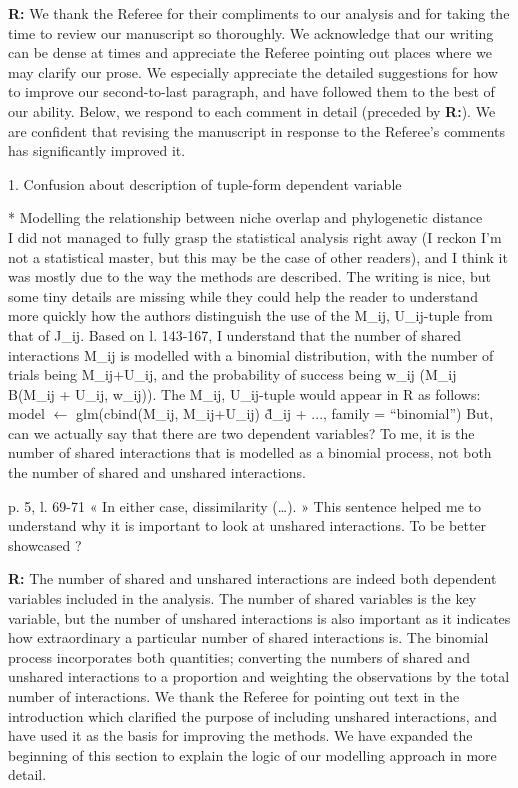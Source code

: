 \documentclass[12pt]{letter}
\newenvironment{refquote}{\bigskip \begin{it}}{\end{it}\smallskip}
\begin{document}
	\textbf{R:} We thank the Referee for their compliments to our analysis and for taking the time to review our manuscript so thoroughly. We acknowledge that our writing can be dense at times and appreciate the Referee pointing out places where we may clarify our prose. We especially appreciate the detailed suggestions for how to improve our second-to-last paragraph, and have followed them to the best of our ability. Below, we respond to each comment in detail (preceded by \textbf{R:}). We are confident that revising the manuscript in response to the Referee's comments has significantly improved it.


	1. Confusion about description of tuple-form dependent variable

		\begin{refquote}
			* Modelling the relationship between niche overlap and phylogenetic distance\\
			I did not managed to fully grasp the statistical analysis right away (I reckon I'm not a statistical master, but this may be the case of other readers), and I think it was mostly due to the way the methods are described. The writing is nice, but some tiny details are missing while they could help the reader to understand more quickly how the authors distinguish the use of the {M\_ij, U\_ij}-tuple from that of J\_ij.
			Based on l. 143-167, I understand that the number of shared interactions M\_ij is modelled with a binomial distribution, with the number of trials being M\_ij+U\_ij, and the probability of success being w\_ij (M\_ij ~ B(M\_ij + U\_ij, w\_ij)). The {M\_ij, U\_ij}-tuple would appear in R as follows:
			model $\leftarrow$ glm(cbind(M\_ij, M\_ij+U\_ij) \~ d\_ij + ..., family = “binomial”)
			But, can we actually say that there are two dependent variables? To me, it is the number of shared interactions that is modelled as a binomial process, not both the number of shared and unshared interactions.

			\smallskip

			p. 5, l. 69-71 « In either case, dissimilarity (…). » This sentence helped me to understand why it is important to look at unshared interactions. To be better showcased ?

		\end{refquote}


		\textbf{R:} The number of shared and unshared interactions are indeed both dependent variables included in the analysis. The number of shared variables is the key variable, but the number of unshared interactions is also important as it indicates how extraordinary a particular number of shared interactions is. The binomial process incorporates both quantities; converting the numbers of shared and unshared interactions to a proportion and weighting the observations by the total number of interactions. We thank the Referee for pointing out text in the introduction which clarified the purpose of including unshared interactions, and have used it as the basis for improving the methods. We have expanded the beginning of this section to explain the logic of our modelling approach in more detail.
\end{document}
